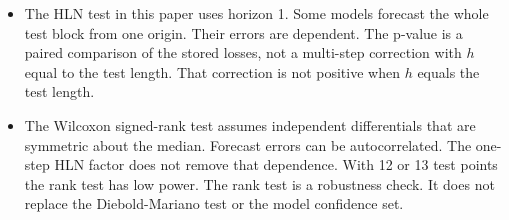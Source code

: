 \begin{itemize}
        Those pairs are not a second rank.
  \item The HLN test in this paper uses horizon 1.
        Some models forecast the whole test block from one origin.
        Their errors are dependent.
        The p-value is a paired comparison of the stored losses, not a multi-step correction with \(h\) equal to the test length.
        That correction is not positive when \(h\) equals the test length.
  \item The Wilcoxon signed-rank test assumes independent differentials that are symmetric about the median.
        Forecast errors can be autocorrelated.
        The one-step HLN factor does not remove that dependence.
        With 12 or 13 test points the rank test has low power.
        The rank test is a robustness check.
        It does not replace the Diebold-Mariano test or the model confidence set.
\end{itemize}
